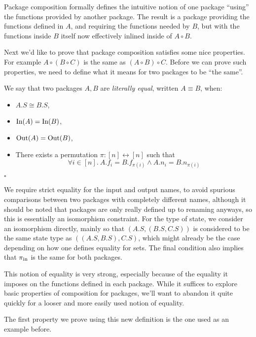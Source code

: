 Package composition formally defines the intuitive notion of one package
``using'' the functions provided by another package.
The result is a package providing the functions defined in $A$,
and requiring the functions needed by $B$, but with the functions
inside $B$ itself now effectively inlined inside of $A \circ B$.

Next we'd like to prove that package composition satisfies some nice
properties.
For example $A \circ (B \circ C)$ is the same as $(A \circ B) \circ C$.
Before we can prove such properties, we need to define
what it means for two packages to be ``the same''.

\begin{definition}
    We say that two packages $A, B$ are \emph{literally equal},
    written $A \equiv B$, when:
    \begin{itemize}
        \item $A.S \cong B.S$,
        \item $\text{In}(A) = \text{In}(B)$,
        \item $\text{Out}(A) = \text{Out}(B)$,
        \item There exists a permutation $\pi : [n] \leftrightarrow [n]$ such that
        $$\forall i \in [n].\ A.f_i = B.f_{\pi(i)} \land A.n_i = B.n_{\pi(i)}$$
    \end{itemize}

    $\square$
\end{definition}

We require strict equality for the input and output names,
to avoid spurious comparisons between two packages with completely different names,
although it should be noted that packages are only really defined up to renaming anyways,
so this is essentially an isomorphism constraint.
For the type of state, we consider an isomorphism directly,
mainly so that $(A.S, (B.S, C.S))$ is considered to be the same state
type as $((A.S, B.S), C.S)$, which might already be the case depending on
how one defines equality for sets.
The final condition also implies that $\pi_{\text{in}}$ is the same
for both packages.

This notion of equality is very strong, especially because of the equality
it imposes on the functions defined in each package.
While it suffices to explore basic properties of composition for packages,
we'll want to abandon it quite quickly for a looser and more easily
used notion of equality.

The first property we prove using this new definition is the one used as an example before.

